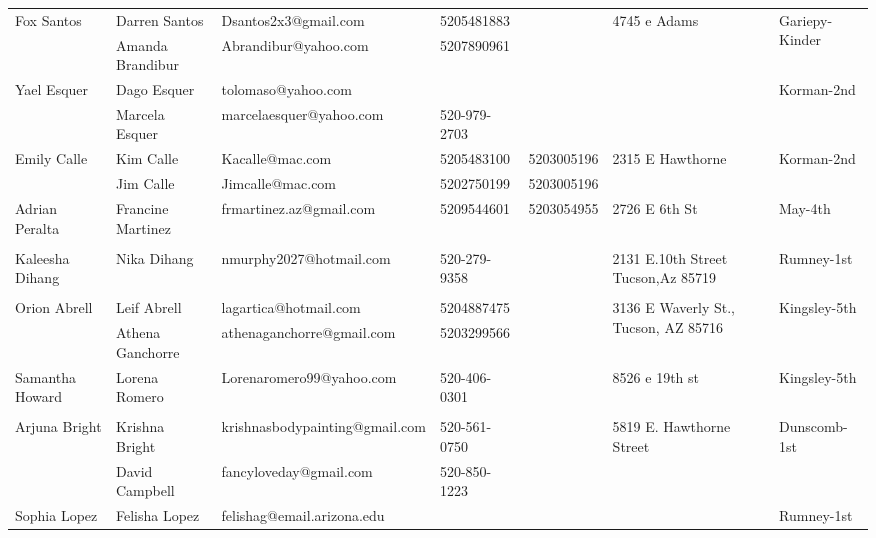 \documentclass[landscape]{book}\usepackage[]{graphicx}\usepackage[]{color}
\begin{document}
\begin{longtable}{p{70pt}|p{75pt}|p{120pt}|p{60pt}|p{60pt}|p{100pt}|p{70pt}|}
\hline
\multirow{2}{70pt}{Fox Santos} & Darren Santos & Dsantos2x3@gmail.com & 5205481883 &  & \multirow{2}{100pt}{4745 e Adams} & \multirow{2}{70pt}{Gariepy-Kinder}\\
 & Amanda Brandibur & Abrandibur@yahoo.com & 5207890961 &  & & \\
\hline
\multirow{2}{70pt}{Yael Esquer} & Dago Esquer & tolomaso@yahoo.com &  &  & \multirow{2}{100pt}{} & \multirow{2}{70pt}{Korman-2nd}\\
 & Marcela Esquer & marcelaesquer@yahoo.com & 520-979-2703 &  & & \\
\hline
\multirow{2}{70pt}{Emily Calle} & Kim Calle & Kacalle@mac.com & 5205483100 & 5203005196 & \multirow{2}{100pt}{2315 E Hawthorne} & \multirow{2}{70pt}{Korman-2nd}\\
 & Jim Calle & Jimcalle@mac.com & 5202750199 & 5203005196 & & \\
\hline
\multirow{2}{70pt}{Adrian Peralta} & Francine Martinez & frmartinez.az@gmail.com & 5209544601 & 5203054955 & \multirow{2}{100pt}{2726 E 6th St} & \multirow{2}{70pt}{May-4th}\\
 &  &  &  &  & & \\
\hline
\multirow{2}{70pt}{Kaleesha Dihang} & Nika Dihang & nmurphy2027@hotmail.com & 520-279-9358 &  & \multirow{2}{100pt}{2131 E.10th Street Tucson,Az 85719} & \multirow{2}{70pt}{Rumney-1st}\\
 &  &  &  &  & & \\
\hline
\multirow{2}{70pt}{Orion Abrell} & Leif Abrell & lagartica@hotmail.com & 5204887475 &  & \multirow{2}{100pt}{3136 E Waverly St., Tucson, AZ 85716} & \multirow{2}{70pt}{Kingsley-5th}\\
 & Athena Ganchorre & athenaganchorre@gmail.com & 5203299566 &  & & \\
\hline
\multirow{2}{70pt}{Samantha Howard } & Lorena Romero  & Lorenaromero99@yahoo.com  & 520-406-0301 &  & \multirow{2}{100pt}{8526 e 19th st} & \multirow{2}{70pt}{Kingsley-5th}\\
 &  &  &  &  & & \\
\hline
\multirow{2}{70pt}{Arjuna Bright} & Krishna Bright & krishnasbodypainting@gmail.com & 520-561-0750 &  & \multirow{2}{100pt}{5819 E. Hawthorne Street} & \multirow{2}{70pt}{Dunscomb-1st}\\
 & David Campbell & fancyloveday@gmail.com & 520-850-1223 &  & & \\
\hline
\multirow{2}{70pt}{Sophia Lopez} & Felisha Lopez & felishag@email.arizona.edu &  &  & \multirow{2}{100pt}{} & \multirow{2}{70pt}{Rumney-1st}\\

\end{longtable}
\end{document}
